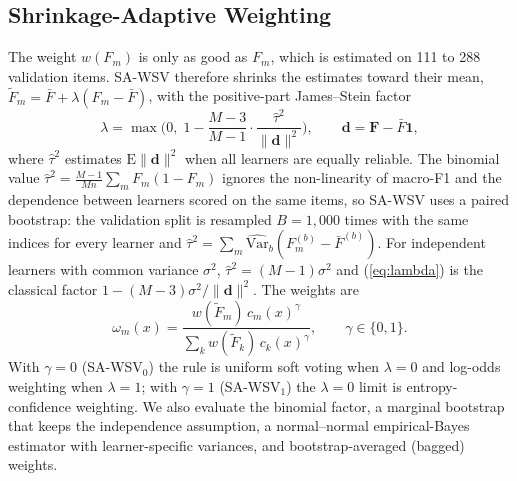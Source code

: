 \documentclass[conference,a4paper]{IEEEtran}
\newcommand{\rc}{SA\mbox{-}WSV}
\newcommand{\rcz}{SA\mbox{-}WSV$_0$}
\newcommand{\rco}{SA\mbox{-}WSV$_1$}
\begin{document}
\subsection{Shrinkage-Adaptive Weighting}
The weight $w(F_m)$ is only as good as $F_m$, which is estimated on 111 to 288 validation items. \rc{} therefore shrinks the estimates toward their mean, $\tilde F_m=\bar F+\lambda(F_m-\bar F)$, with the positive-part James--Stein factor \cite{efron2021}
\begin{equation}
\lambda=\max\Big(0,\;1-\frac{M-3}{M-1}\cdot\frac{\hat\tau^{2}}{\lVert\mathbf d\rVert^{2}}\Big),\qquad \mathbf d=\mathbf F-\bar F\mathbf 1,
\label{eq:lambda}
\end{equation}
where $\hat\tau^2$ estimates $\mathrm{E}\lVert\mathbf d\rVert^2$ when all learners are equally reliable. The binomial value $\hat\tau^2=\frac{M-1}{Mn}\sum_m F_m(1-F_m)$ ignores the non-linearity of macro-F1 and the dependence between learners scored on the same items, so \rc{} uses a paired bootstrap: the validation split is resampled $B=1{,}000$ times with the same indices for every learner and $\hat\tau^2=\sum_m\widehat{\mathrm{Var}}_b(F^{(b)}_m-\bar F^{(b)})$. For independent learners with common variance $\sigma^2$, $\hat\tau^2=(M-1)\sigma^2$ and (\ref{eq:lambda}) is the classical factor $1-(M-3)\sigma^2/\lVert\mathbf d\rVert^2$. The weights are
\begin{equation}
\omega_m(x)=\frac{w(\tilde F_m)\,c_m(x)^{\gamma}}{\sum_{k}w(\tilde F_k)\,c_k(x)^{\gamma}},\qquad\gamma\in\{0,1\}.
\label{eq:omega}
\end{equation}
With $\gamma=0$ (\rcz) the rule is uniform soft voting when $\lambda=0$ and log-odds weighting when $\lambda=1$; with $\gamma=1$ (\rco) the $\lambda=0$ limit is entropy-confidence weighting. We also evaluate the binomial factor, a marginal bootstrap that keeps the independence assumption, a normal--normal empirical-Bayes estimator \cite{efron2021} with learner-specific variances, and bootstrap-averaged (bagged) weights.
\end{document}
